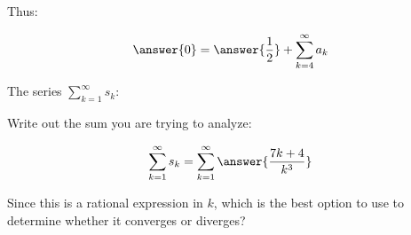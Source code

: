 \documentclass{ximera}
\begin{document}
\begin{exercise}
\begin{exercise}
\begin{exercise}
\begin{exercise}
Thus:

\[
\answer{0} = \answer{\frac{1}{2}} + \sum_{k=4}^{\infty} a_k
\]
\begin{exercise}
The series $\sum_{k=1}^{\infty} s_k$: 

\begin{multipleChoice}
\end{multipleChoice}

\begin{hint}
Write out the sum you are trying to analyze:

\[
\sum_{k=1}^{\infty} s_k = \sum_{k=1}^{\infty} \answer{\frac{7k+4}{k^3}}
\]

Since this is a rational expression in $k$, which is the best option to use to determine whether it converges or diverges?

\begin{multipleChoice}
\end{multipleChoice}

\end{hint}
\end{exercise}
\end{exercise}
\end{exercise}
\end{exercise}
\end{exercise}
\end{document}
